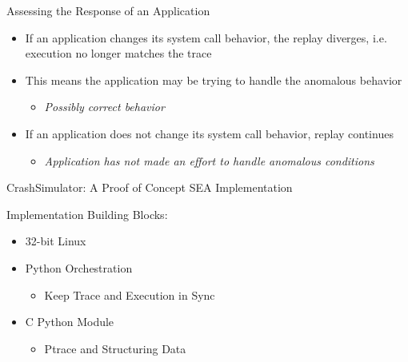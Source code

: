 \documentclass[pdf]{beamer}
\begin{document}
%
%


\begin{frame}{Assessing the Response of an Application}
  \begin{itemize}
  \item{If an application changes its system call behavior, the replay diverges,
      i.e. execution no longer matches the trace}
  \item{This means the application may be trying to handle the anomalous behavior}
    \begin{itemize}
    \item{\textit{Possibly correct behavior}}
    \end{itemize}
  \item{If an application does not change its system call behavior, replay
      continues}
    \begin{itemize}
    \item{\textit{Application has not made an effort to handle anomalous conditions}}
    \end{itemize}
  \end{itemize}
\end{frame}


\begin{frame}{CrashSimulator: A Proof of Concept SEA Implementation}

  Implementation Building Blocks:

  \begin{itemize}
  \item{32-bit Linux}
  \item{Python Orchestration}
    \begin{itemize}
    \item{Keep Trace and Execution in Sync}
    \end{itemize}
  \item{C Python Module}
    \begin{itemize}
    \item{Ptrace and Structuring Data}
    \end{itemize}
  \end{itemize}
\end{frame}
\end{document}
